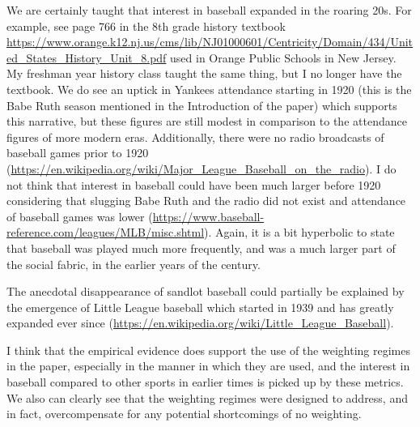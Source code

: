 \documentclass[11pt]{article}
\begin{document}
We are certainly taught that interest in baseball expanded in the roaring 
20s.  For example, see page 766 in the 8th grade history textbook 
\url{https://www.orange.k12.nj.us/cms/lib/NJ01000601/Centricity/Domain/434/United_States_History_Unit_8.pdf} 
used in Orange Public Schools in New Jersey.  
My freshman year history class taught the same thing, but I no longer 
have the textbook.
We do see an uptick in 
Yankees attendance starting in 1920 (this is the Babe Ruth season 
mentioned in the Introduction of the paper) which supports this narrative, 
but these figures are still modest in comparison to the attendance figures of 
more modern eras.  Additionally, there were no radio broadcasts of baseball 
games prior to 1920 
(\url{https://en.wikipedia.org/wiki/Major_League_Baseball_on_the_radio}).  
I do not think that interest in baseball could have been much larger before 
1920 considering that slugging Babe Ruth and the radio did not exist and 
attendance of baseball games was lower 
(\url{https://www.baseball-reference.com/leagues/MLB/misc.shtml}).  
Again, it is a bit hyperbolic to state that baseball was played much more 
frequently, and was a much larger part of the social fabric, 
in the earlier years of the century.

The anecdotal disappearance of sandlot baseball could partially be explained 
by the emergence of Little League baseball which started in 1939 and has 
greatly expanded ever since 
(\url{https://en.wikipedia.org/wiki/Little_League_Baseball}).

I think that the empirical evidence does support the use of the 
weighting regimes in the paper, especially in the manner in which they are 
used, and the interest in baseball compared to other sports in earlier times 
is picked up by these metrics.  
We also can clearly see that the weighting regimes were designed to address, 
and in fact, overcompensate for any potential shortcomings of no weighting.
 
\end{document}
